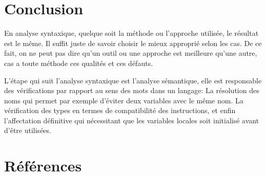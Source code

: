 \documentclass{article}
\begin{document}
\newpage
\section{Conclusion}
\label{hints}

En analyse syntaxique, quelque soit la méthode ou l’approche utilisée, le résultat est le même. Il suffit juste de savoir choisir le mieux approprié selon les cas. De ce fait, on ne peut pas dire qu’un outil ou une approche est meilleure qu’une autre, cas a toute méthode ces qualités et ces défauts.

L’étape qui suit l’analyse syntaxique est l’analyse sémantique, elle est responsable des vérifications par rapport au sens des mots dans un langage:
La résolution des noms qui permet par exemple d’éviter deux variables avec le même nom.
La vérification des types en termes de compatibilité des instructions, et enfin l’affectation définitive qui nécessitant que les variables locales soit initialisé avant d’être utilisées.

\newpage
\section{Références}
\label{hints}



\end{document}
